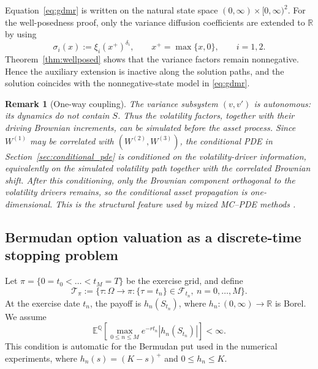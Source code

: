\documentclass[pdflatex,sn-mathphys-num]{sn-jnl}
\theoremstyle{thmstyleone}%
\theoremstyle{thmstylethree}%
\theoremstyle{thmstyletwo}%
\newtheorem{remark}[theorem]{Remark}
\newcommand{\E}{\mathbb E}
\newcommand{\Q}{\mathbb Q}
\newcommand{\R}{\mathbb R}
\begin{document}
Equation~\eqref{eq:gdmr} is written on the natural state space $(0,\infty)\times[0,\infty)^2$. For the well-posedness proof, only the variance diffusion coefficients are extended to $\R$ by using
\[
\sigma_i(x):=\xi_i(x^+)^{\delta_i},\qquad x^+=\max\{x,0\},\qquad i=1,2.
\]
Theorem~\ref{thm:wellposed} shows that the variance factors remain nonnegative. Hence the auxiliary extension is inactive along the solution paths, and the solution coincides with the nonnegative-state model in \eqref{eq:gdmr}.

\begin{remark}[One-way coupling]\label{rem:one-way}
The variance subsystem $(v,v')$ is autonomous: its dynamics do not contain $S$. Thus the volatility factors, together with their driving Brownian increments, can be simulated before the asset process. Since $W^{(1)}$ may be correlated with $(W^{(2)},W^{(3)})$, the conditional PDE in Section~\ref{sec:conditional_pde} is conditioned on the volatility-driver information, equivalently on the simulated volatility path together with the correlated Brownian shift. After this conditioning, only the Brownian component orthogonal to the volatility drivers remains, so the conditional asset propagation is one-dimensional. This is the structural feature used by mixed MC--PDE methods \citep{farahany2020mixing}.
\end{remark}

\subsection{Bermudan option valuation as a discrete-time stopping problem}

Let $\pi=\{0=t_0<\dots<t_M=T\}$ be the exercise grid, and define
\[
\mathcal T_\pi:=
\{\tau:\Omega\to\pi:\{\tau=t_n\}\in\mathcal F_{t_n},\ n=0,\dots,M\}.
\]
At the exercise date $t_n$, the payoff is $h_n(S_{t_n})$, where $h_n:(0,\infty)\to\R$ is Borel. We assume
\[
\E^\Q\!\left[\max_{0\le n\le M} e^{-rt_n}|h_n(S_{t_n})|\right]<\infty.
\]
This condition is automatic for the Bermudan put used in the numerical experiments, where $h_n(s)=(K-s)^+$ and $0\le h_n\le K$.
\end{document}
